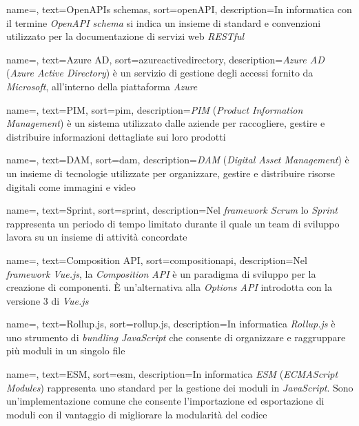  {
    name=,
    text=OpenAPIs schemas,
    sort=openAPI,
    description={In informatica con il termine \emph{OpenAPI schema} si indica un insieme di standard e convenzioni utilizzato per la documentazione di servizi web \emph{RESTful}}
}

 {
    name=,
    text=Azure AD,
    sort=azureactivedirectory,
    description={\emph{Azure AD} (\emph{Azure Active Directory}) è un servizio di gestione degli accessi fornito da \emph{Microsoft}, all'interno della piattaforma \emph{Azure}}
}

 {
    name=,
    text=PIM,
    sort=pim,
    description={\emph{PIM} (\emph{Product Information Management}) è un sistema utilizzato dalle aziende per raccogliere, gestire e distribuire informazioni dettagliate sui loro prodotti}
}

 {
    name=,
    text=DAM,
    sort=dam,
    description={\emph{DAM} (\emph{Digital Asset Management}) è un insieme di tecnologie utilizzate per organizzare, gestire e distribuire risorse digitali come immagini e video}
}


 {
    name=,
    text=Sprint,
    sort=sprint,
    description={Nel \emph{framework Scrum} lo \emph{Sprint} rappresenta un periodo di tempo limitato durante il quale un team di sviluppo lavora su un insieme di attività concordate}
}

 {
    name=,
    text=Composition API,
    sort=compositionapi,
    description={Nel \emph{framework Vue.js}, la \emph{Composition API} è un paradigma di sviluppo per la creazione di componenti. È un'alternativa alla \emph{Options API} introdotta con la versione 3 di \emph{Vue.js}}
}

 {
    name=,
    text=Rollup.js,
    sort=rollup.js,
    description={In informatica \emph{Rollup.js} è uno strumento di \emph{bundling JavaScript} che consente di organizzare e raggruppare più moduli in un singolo file}
}

 {
    name=,
    text=ESM,
    sort=esm,
    description={In informatica \emph{ESM} (\emph{ECMAScript Modules}) rappresenta uno standard per la gestione dei moduli in \emph{JavaScript}. Sono un'implementazione comune che consente l'importazione
    ed esportazione di moduli con il vantaggio di migliorare la modularità del codice}
}

